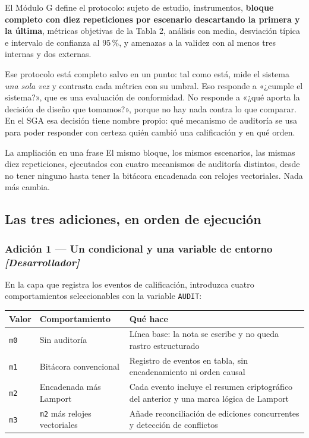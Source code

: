 \documentclass[11pt,a4paper]{article}
\begin{document}
El Módulo G define el protocolo: sujeto de estudio, instrumentos, \textbf{bloque completo con diez repeticiones por escenario descartando la primera y la última}, métricas objetivas de la Tabla 2, análisis con media, desviación típica e intervalo de confianza al 95\,\%, y amenazas a la validez con al menos tres internas y dos externas.

Ese protocolo está completo salvo en un punto: tal como está, mide el sistema \emph{una sola vez} y contrasta cada métrica con su umbral. Eso responde a «¿cumple el sistema?», que es una evaluación de conformidad. No responde a «¿qué aporta la decisión de diseño que tomamos?», porque no hay nada contra lo que comparar. En el SGA esa decisión tiene nombre propio: qué mecanismo de auditoría se usa para poder responder con certeza quién cambió una calificación y en qué orden.

\begin{uteqbox}{La ampliación en una frase}
	El mismo bloque, los mismos escenarios, las mismas diez repeticiones, ejecutados con cuatro mecanismos de auditoría distintos, desde no tener ninguno hasta tener la bitácora encadenada con relojes vectoriales. Nada más cambia.
\end{uteqbox}

\subsection{Las tres adiciones, en orden de ejecución}

\subsubsection{Adición 1 --- Un condicional y una variable de entorno \emph{[Desarrollador]}}

En la capa que registra los eventos de calificación, introduzca cuatro comportamientos seleccionables con la variable \texttt{AUDIT}:

\begin{center}
	\small
	\begin{tabular}{@{}p{1.4cm}p{4.0cm}p{9.6cm}@{}}
		\toprule
		\textbf{Valor} & \textbf{Comportamiento} & \textbf{Qué hace} \\
		\midrule
		\texttt{m0} & Sin auditoría & Línea base: la nota se escribe y no queda rastro estructurado \\
		\texttt{m1} & Bitácora convencional & Registro de eventos en tabla, sin encadenamiento ni orden causal \\
		\texttt{m2} & Encadenada más Lamport & Cada evento incluye el resumen criptográfico del anterior y una marca lógica de Lamport \\
		\texttt{m3} & \texttt{m2} más relojes vectoriales & Añade reconciliación de ediciones concurrentes y detección de conflictos \\
		\bottomrule
	\end{tabular}
\end{center}
\end{document}
